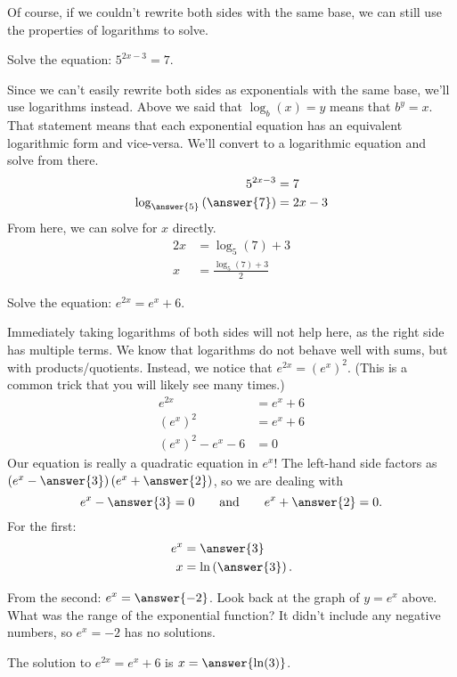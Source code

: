 \documentclass{ximera}
\begin{document}
Of course, if we couldn't rewrite both sides with the same base, we can still use the properties of logarithms to solve.
\begin{example}
	Solve the equation: $\displaystyle 5^{2x-3} = 7$.
	\begin{explanation}
		Since we can't easily rewrite both sides as exponentials with the same base, we'll use logarithms instead.  Above we said that
		$\log_b(x) = y$ means that $b^y = x$.  That statement means that each exponential equation has an equivalent logarithmic form
		and vice-versa.  We'll convert to a logarithmic equation and solve from there.
		\begin{align*}
			5^{2x-3} &= 7\\
			\log_{\answer{5}}\left(  \answer{7} \right) &= 2x-3
		\end{align*}
		From here, we can solve for $x$ directly.
		\begin{align*}
			2x &= \log_{5}\left(7\right) + 3\\
			x &= \frac{\log_{5}\left(7\right) + 3}{2}
		\end{align*}
	\end{explanation} 
\end{example}


\begin{example}
	Solve the equation: $\displaystyle e^{2x} = e^x + 6$. 
	\begin{explanation}
		Immediately taking logarithms of both sides will not help here, as the right side has multiple terms.  We know that logarithms do not
		behave well with sums, but with products/quotients.  Instead, we notice that $e^{2x} = \left(e^x\right)^2$. (This is a common trick that
		you will likely see many times.)  
		\begin{align*}
			e^{2x} &= e^x + 6\\
			\left(e^x\right)^2 &= e^x + 6\\
			\left(e^x\right)^2 - e^x - 6 &= 0
		\end{align*}
		Our equation is really a quadratic equation in $e^x$!  The left-hand side factors as $\left( e^x - \answer{3}\right) \left(e^x + \answer{2}\right)$, so we are dealing
		with \[ e^x - \answer{3} = 0  \qquad  \textrm{and} \qquad e^x+\answer{2} = 0.\]
		For the first:
		\begin{align*}
			e^x &= \answer{3}\\
			x &= \ln\left( \answer{3}\right).
		\end{align*}
		
		From the second: $\displaystyle e^x = \answer{-2}$.  Look back at the graph of $y=e^x$ above.  What was the range of the exponential function?  It didn't include any negative
		numbers, so $e^x = -2$ has no solutions. 
		
		The solution to $\displaystyle e^{2x} = e^x + 6$ is $x = \answer{\ln(3)}$.
	\end{explanation}
\end{example}
\end{document}
